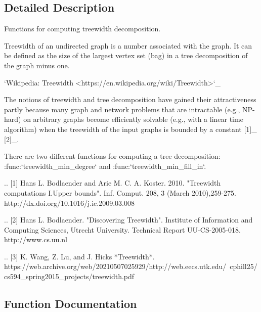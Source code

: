 \subsection{Detailed Description}
\begin{DoxyVerb}Functions for computing treewidth decomposition.

Treewidth of an undirected graph is a number associated with the graph.
It can be defined as the size of the largest vertex set (bag) in a tree
decomposition of the graph minus one.

`Wikipedia: Treewidth <https://en.wikipedia.org/wiki/Treewidth>`_

The notions of treewidth and tree decomposition have gained their
attractiveness partly because many graph and network problems that are
intractable (e.g., NP-hard) on arbitrary graphs become efficiently
solvable (e.g., with a linear time algorithm) when the treewidth of the
input graphs is bounded by a constant [1]_ [2]_.

There are two different functions for computing a tree decomposition:
:func:`treewidth_min_degree` and :func:`treewidth_min_fill_in`.

.. [1] Hans L. Bodlaender and Arie M. C. A. Koster. 2010. "Treewidth
      computations I.Upper bounds". Inf. Comput. 208, 3 (March 2010),259-275.
      http://dx.doi.org/10.1016/j.ic.2009.03.008

.. [2] Hans L. Bodlaender. "Discovering Treewidth". Institute of Information
      and Computing Sciences, Utrecht University.
      Technical Report UU-CS-2005-018.
      http://www.cs.uu.nl

.. [3] K. Wang, Z. Lu, and J. Hicks *Treewidth*.
      https://web.archive.org/web/20210507025929/http://web.eecs.utk.edu/~cphill25/cs594_spring2015_projects/treewidth.pdf\end{DoxyVerb}
 

\subsection{Function Documentation}
\mbox{\label{namespacenetworkx_1_1algorithms_1_1approximation_1_1treewidth_a0bb0e946b540b4d1287654403c7e38ba}} 
